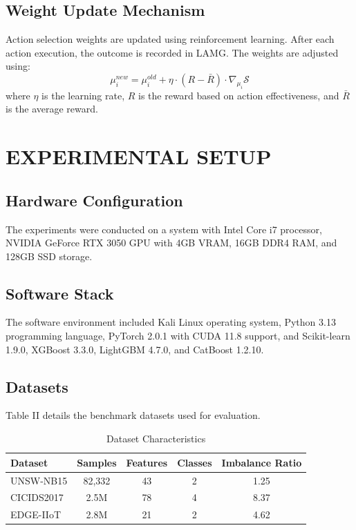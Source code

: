 \documentclass[12pt]{article}
\begin{document}
\subsection{Weight Update Mechanism}
Action selection weights are updated using reinforcement learning. After each action execution, the outcome is recorded in LAMG. The weights are adjusted using:
\begin{equation}
    \mu_i^{new} = \mu_i^{old} + \eta \cdot (R - \bar{R}) \cdot \nabla_{\mu_i} \mathcal{S}
    \label{eq:weight_update}
\end{equation}
where \(\eta\) is the learning rate, \(R\) is the reward based on action effectiveness, and \(\bar{R}\) is the average reward.

\newpage

\section{EXPERIMENTAL SETUP}

\subsection{Hardware Configuration}
The experiments were conducted on a system with Intel Core i7 processor, NVIDIA GeForce RTX 3050 GPU with 4GB VRAM, 16GB DDR4 RAM, and 128GB SSD storage.

\subsection{Software Stack}
The software environment included Kali Linux operating system, Python 3.13 programming language, PyTorch 2.0.1 with CUDA 11.8 support, and Scikit-learn 1.9.0, XGBoost 3.3.0, LightGBM 4.7.0, and CatBoost 1.2.10.

\subsection{Datasets}
Table II details the benchmark datasets used for evaluation.

\begin{table}[H]
\centering
\caption{Dataset Characteristics}
\begin{tabular}{|l|c|c|c|c|}
\hline
\textbf{Dataset} & \textbf{Samples} & \textbf{Features} & \textbf{Classes} & \textbf{Imbalance Ratio} \\
\hline
UNSW-NB15 & 82,332 & 43 & 2 & 1.25 \\
CICIDS2017 & 2.5M & 78 & 4 & 8.37 \\
EDGE-IIoT & 2.8M & 21 & 2 & 4.62 \\
\hline
\end{tabular}
\label{tab:datasets}
\end{table}
\end{document}
